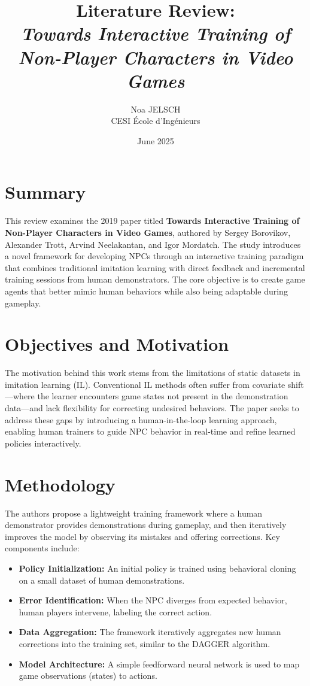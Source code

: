 \documentclass[12pt,a4paper]{article}
\title{Literature Review:\\\textit{Towards Interactive Training of Non-Player Characters in Video Games}}
\author{Noa JELSCH\\CESI École d'Ingénieurs}
\date{June 2025}
\begin{document}
\maketitle

\section*{Summary}

This review examines the 2019 paper titled \textbf{Towards Interactive Training of Non-Player Characters in Video Games}, authored by Sergey Borovikov, Alexander Trott, Arvind Neelakantan, and Igor Mordatch. The study introduces a novel framework for developing NPCs through an interactive training paradigm that combines traditional imitation learning with direct feedback and incremental training sessions from human demonstrators. The core objective is to create game agents that better mimic human behaviors while also being adaptable during gameplay.

\section*{Objectives and Motivation}

The motivation behind this work stems from the limitations of static datasets in imitation learning (IL). Conventional IL methods often suffer from covariate shift—where the learner encounters game states not present in the demonstration data—and lack flexibility for correcting undesired behaviors. The paper seeks to address these gaps by introducing a human-in-the-loop learning approach, enabling human trainers to guide NPC behavior in real-time and refine learned policies interactively.

\section*{Methodology}

The authors propose a lightweight training framework where a human demonstrator provides demonstrations during gameplay, and then iteratively improves the model by observing its mistakes and offering corrections. Key components include:

\begin{itemize}
  \item \textbf{Policy Initialization:} An initial policy is trained using behavioral cloning on a small dataset of human demonstrations.
  \item \textbf{Error Identification:} When the NPC diverges from expected behavior, human players intervene, labeling the correct action.
  \item \textbf{Data Aggregation:} The framework iteratively aggregates new human corrections into the training set, similar to the DAGGER algorithm.
  \item \textbf{Model Architecture:} A simple feedforward neural network is used to map game observations (states) to actions.
\end{itemize}
\end{document}

